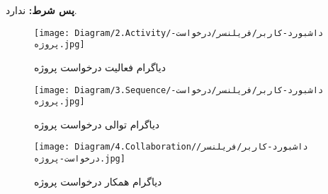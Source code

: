 \noindent
\textbf{پس شرط:}
ندارد.




\begin{figure}[H]
	\texttt{[image: Diagram/2.Activity/داشبورد-کاربر/فریلنسر/درخواست-پروژه.jpg]}
	\centering
	\caption{دیاگرام فعالیت درخواست پروژه}
	\label{fig:a:درخواست-پروژه}
\end{figure}
\begin{figure}[H]
	\texttt{[image: Diagram/3.Sequence/داشبورد-کاربر/فریلنسر/درخواست-پروژه.jpg]}
	\caption{دیاگرام توالی درخواست پروژه}
	\centering
	\label{fig:s:درخواست-پروژه}
\end{figure}
\begin{figure}[H]
	\texttt{[image: Diagram/4.Collaboration/داشبورد-کاربر/فریلنسر/درخواست-پروژه.jpg]}
	\centering
	\caption{دیاگرام همکار درخواست پروژه}
	\label{fig:c:درخواست-پروژه}
\end{figure}